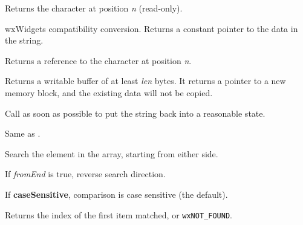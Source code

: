 \label{wxstringgetchar}


Returns the character at position {\it n} (read-only).

\label{wxstringgetdata}


wxWidgets compatibility conversion. Returns a constant pointer to the data in the string.

\label{wxstringgetwritablechar}


Returns a reference to the character at position {\it n}.

\label{wxstringgetwritebuf}


Returns a writable buffer of at least {\it len} bytes.
It returns a pointer to a new memory block, and the
existing data will not be copied.

Call  as soon as possible
to put the string back into a reasonable state.

\label{wxstringindex}



Same as .


Search the element in the array, starting from either side.

If {\it fromEnd} is true, reverse search direction.

If {\bf caseSensitive}, comparison is case sensitive (the default).

Returns the index of the first item matched, or {\tt wxNOT\_FOUND}.

%
%
\label{wxstringisascii}

